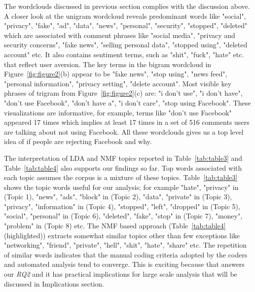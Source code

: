 The wordclouds discussed in previous section complies with the discussion above. A closer look at the unigram wordcloud reveals predominant words like "social", "privacy", "fake", "ad", "data", "news", "personal", "security", "stopped", "deleted" which are associated with comment phrases like "social media", "privacy and security concerns", "fake news", "selling personal data", "stopped using", "deleted account" etc. It also contains sentiment terms, such as "shit", "fuck", "hate" etc. that reflect user aversion. The key terms in the bigram wordcloud in Figure~\ref{fig:figure2}(b) appear to be "fake news", "stop using", "news feed", "personal information", "privacy setting", "delete account". Most visible key phrases of trigram from Figure~\ref{fig:figure2}(c) are: "i don't use", "i don't have", "don't use Facebook", "don't have a", "i don't care", "stop using Facebook". These visualizations are informative, for example, terms like "don't use Facebook" appeared 17 times which implies at least 17 times in a set of 516 comments users are talking about not using Facebook. All these wordclouds gives us a top level idea of if people are rejecting Facebook and why. 

The interpretation of LDA and NMF topics reported in Table~\ref{tab:table3} and Table~\ref{tab:table4} also supports our findings so far. Top words associated with each topic assumes the corpus is a mixture of these topics. Table~\ref{tab:table3} shows the topic words useful for our analysis; for example "hate", "privacy" in (Topic 1), "news", "ads", "block" in (Topic 2), "data", "private" in (Topic 3), "privacy", "information" in (Topic 4), "stopped", "left", "dropped" in (Topic 5), "social", "personal" in (Topic 6), "deleted", "fake", "stop" in (Topic 7), "money", "problem" in (Topic 8) etc. The NMF based approach (Table~\ref{tab:table4} (highlighted)) extracts somewhat similar topics other than few exceptions like "networking", "friend", "private", "hell", "shit", "hate", "share" etc. The repetition of similar words indicates that the manual coding criteria adopted by the coders and automated analysis tend to converge. This is exciting because that answers our \textit{RQ2} and it has practical implications for large scale analysis that will be discussed in Implications section.

